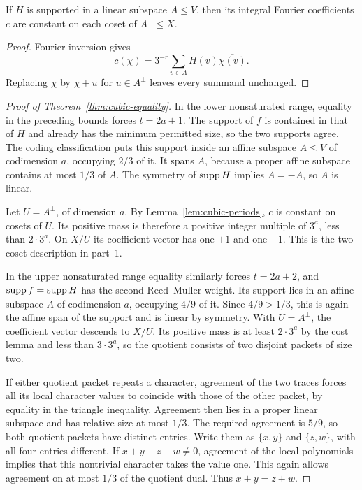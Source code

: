 \begin{lemma}
\label{lem:cubic-periods}
If $H$ is supported in a linear subspace $A\leq V$, then its integral
Fourier coefficients $c$ are constant on each coset of $A^\perp\leq X$.
\end{lemma}

\begin{proof}
Fourier inversion gives
\[
 c(\chi)=3^{-r}\sum_{v\in A}H(v)\overline{\chi(v)}.
\]
Replacing $\chi$ by $\chi+u$ for $u\in A^\perp$ leaves every summand
unchanged.
\end{proof}

\begin{proof}[Proof of Theorem~\ref{thm:cubic-equality}]
In the lower nonsaturated range, equality in the preceding bounds forces
$t=2a+1$. The support of $f$ is contained in that of $H$ and already has
the minimum permitted size, so the two supports agree. The coding
classification puts this support inside an affine subspace $A\leq V$
of codimension $a$, occupying $2/3$ of it. It spans $A$, because a
proper affine subspace contains at most $1/3$ of $A$. The symmetry of
$\operatorname{supp} H$ implies $A=-A$, so $A$ is linear.

Let $U=A^\perp$, of dimension $a$. By
Lemma~\ref{lem:cubic-periods}, $c$ is constant on cosets of $U$. Its
positive mass is therefore a positive integer multiple of $3^a$, less
than $2\cdot3^a$. On $X/U$ its coefficient vector has one $+1$ and
one $-1$. This is the two-coset description in part~1.

In the upper nonsaturated range equality similarly forces $t=2a+2$,
and $\operatorname{supp} f=\operatorname{supp} H$ has the second Reed--Muller weight. Its support
lies in an affine subspace $A$ of codimension $a$, occupying $4/9$ of
it. Since $4/9>1/3$, this is again the affine span of the support and is
linear by symmetry. With $U=A^\perp$, the coefficient vector descends
to $X/U$. Its positive mass is at least $2\cdot3^a$ by the cost lemma
and less than $3\cdot3^a$, so the quotient consists of two disjoint
packets of size two.

If either quotient packet repeats a character, agreement of the two
traces forces all its local character values to coincide with those
of the other packet, by equality in the triangle inequality. Agreement
then lies in a proper linear subspace and has relative size at most
$1/3$. The required agreement is $5/9$, so both quotient packets have
distinct entries. Write them as $\{x,y\}$ and $\{z,w\}$, with all four
entries different. If $x+y-z-w\ne0$, agreement of the local polynomials
implies that this nontrivial character takes the value one. This again
allows agreement on at most $1/3$ of the quotient dual. Thus
$x+y=z+w$.


\end{proof}
